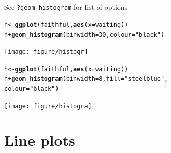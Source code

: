 \documentclass{beamer}\usepackage[]{graphicx}\usepackage[]{color}
\makeatletter
\newcommand{\hlstr}[1]{\textcolor[rgb]{0.192,0.494,0.8}{#1}}%
\newcommand{\hlkwd}[1]{\textcolor[rgb]{0.737,0.353,0.396}{\textbf{#1}}}%
\newenvironment{kframe}{%
 \def\at@end@of@kframe{}%
 \ifinner\ifhmode%
  \def\at@end@of@kframe{\end{minipage}}%
  \begin{minipage}{\columnwidth}%
 \fi\fi%
 \def\FrameCommand##1{\hskip\@totalleftmargin \hskip-\fboxsep
 \colorbox{shadecolor}{##1}\hskip-\fboxsep
     \hskip-\linewidth \hskip-\@totalleftmargin \hskip\columnwidth}%
 \MakeFramed {\advance\hsize-\width
   \@totalleftmargin\z@ \linewidth\hsize
   \@setminipage}}%
 {\par\unskip\endMakeFramed%
 \at@end@of@kframe}
\newenvironment{knitrout}{}{} %
\makeatother
\begin{document}
\begin{frame}[fragile]
See \texttt{?geom\_histogram} for list of options
\begin{knitrout}\footnotesize
{}\color{fgcolor}\begin{kframe}
\begin{alltt}
h <- \hlkwd{ggplot}(faithful, \hlkwd{aes}(x = waiting))
h + \hlkwd{geom_histogram}(binwidth = 30, colour = \hlstr{"black"})
\end{alltt}
\end{kframe}

{\centering \texttt{[image: figure/histogr]} 

}



\end{knitrout}

\end{frame}


\begin{frame}[fragile]
\begin{knitrout}\footnotesize
{}\color{fgcolor}\begin{kframe}
\begin{alltt}
h <- \hlkwd{ggplot}(faithful, \hlkwd{aes}(x = waiting))
h + \hlkwd{geom_histogram}(binwidth = 8, fill = \hlstr{"steelblue"},
colour = \hlstr{"black"})
\end{alltt}
\end{kframe}

{\centering \texttt{[image: figure/histogra]} 

}



\end{knitrout}

\end{frame}


\section*{Line plots}
\frame{\sectionpage}

\end{document}
